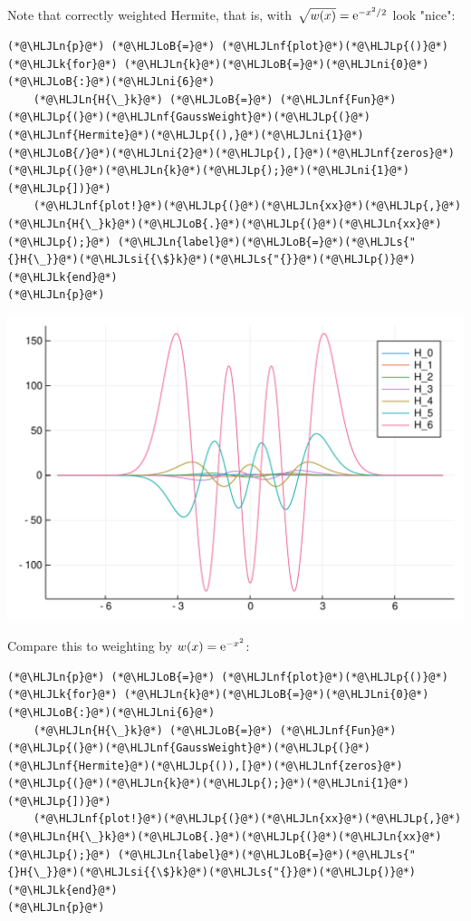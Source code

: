 \documentclass[12pt,a4paper]{article}
\newcommand{\HLJLk}[1]{\textcolor[RGB]{148,91,176}{\textbf{#1}}}
\newcommand{\HLJLn}[1]{#1}
\newcommand{\HLJLnf}[1]{\textcolor[RGB]{66,102,213}{#1}}
\newcommand{\HLJLs}[1]{\textcolor[RGB]{201,61,57}{#1}}
\newcommand{\HLJLsi}[1]{#1}
\newcommand{\HLJLni}[1]{\textcolor[RGB]{59,151,46}{#1}}
\newcommand{\HLJLoB}[1]{\textcolor[RGB]{102,102,102}{\textbf{#1}}}
\newcommand{\HLJLp}[1]{#1}
\def\E{ {\rm e} }
\begin{document}
Note that correctly weighted Hermite, that is, with $\sqrt{w(x)} = \E^{-x^2/2}$ look "nice":


\begin{lstlisting}
(*@\HLJLn{p}@*) (*@\HLJLoB{=}@*) (*@\HLJLnf{plot}@*)(*@\HLJLp{()}@*)
(*@\HLJLk{for}@*) (*@\HLJLn{k}@*)(*@\HLJLoB{=}@*)(*@\HLJLni{0}@*)(*@\HLJLoB{:}@*)(*@\HLJLni{6}@*)
    (*@\HLJLn{H{\_}k}@*) (*@\HLJLoB{=}@*) (*@\HLJLnf{Fun}@*)(*@\HLJLp{(}@*)(*@\HLJLnf{GaussWeight}@*)(*@\HLJLp{(}@*)(*@\HLJLnf{Hermite}@*)(*@\HLJLp{(),}@*)(*@\HLJLni{1}@*)(*@\HLJLoB{/}@*)(*@\HLJLni{2}@*)(*@\HLJLp{),[}@*)(*@\HLJLnf{zeros}@*)(*@\HLJLp{(}@*)(*@\HLJLn{k}@*)(*@\HLJLp{);}@*)(*@\HLJLni{1}@*)(*@\HLJLp{])}@*)
    (*@\HLJLnf{plot!}@*)(*@\HLJLp{(}@*)(*@\HLJLn{xx}@*)(*@\HLJLp{,}@*) (*@\HLJLn{H{\_}k}@*)(*@\HLJLoB{.}@*)(*@\HLJLp{(}@*)(*@\HLJLn{xx}@*)(*@\HLJLp{);}@*) (*@\HLJLn{label}@*)(*@\HLJLoB{=}@*)(*@\HLJLs{"{}H{\_}}@*)(*@\HLJLsi{{\$}k}@*)(*@\HLJLs{"{}}@*)(*@\HLJLp{)}@*)
(*@\HLJLk{end}@*)
(*@\HLJLn{p}@*)
\end{lstlisting}

\includegraphics[width=\linewidth]{figures/Lecture24_5_1.pdf}

Compare this to weighting by $w(x) = \E^{-x^2}$:


\begin{lstlisting}
(*@\HLJLn{p}@*) (*@\HLJLoB{=}@*) (*@\HLJLnf{plot}@*)(*@\HLJLp{()}@*)
(*@\HLJLk{for}@*) (*@\HLJLn{k}@*)(*@\HLJLoB{=}@*)(*@\HLJLni{0}@*)(*@\HLJLoB{:}@*)(*@\HLJLni{6}@*)
    (*@\HLJLn{H{\_}k}@*) (*@\HLJLoB{=}@*) (*@\HLJLnf{Fun}@*)(*@\HLJLp{(}@*)(*@\HLJLnf{GaussWeight}@*)(*@\HLJLp{(}@*)(*@\HLJLnf{Hermite}@*)(*@\HLJLp{()),[}@*)(*@\HLJLnf{zeros}@*)(*@\HLJLp{(}@*)(*@\HLJLn{k}@*)(*@\HLJLp{);}@*)(*@\HLJLni{1}@*)(*@\HLJLp{])}@*)
    (*@\HLJLnf{plot!}@*)(*@\HLJLp{(}@*)(*@\HLJLn{xx}@*)(*@\HLJLp{,}@*) (*@\HLJLn{H{\_}k}@*)(*@\HLJLoB{.}@*)(*@\HLJLp{(}@*)(*@\HLJLn{xx}@*)(*@\HLJLp{);}@*) (*@\HLJLn{label}@*)(*@\HLJLoB{=}@*)(*@\HLJLs{"{}H{\_}}@*)(*@\HLJLsi{{\$}k}@*)(*@\HLJLs{"{}}@*)(*@\HLJLp{)}@*)
(*@\HLJLk{end}@*)
(*@\HLJLn{p}@*)
\end{lstlisting}
\end{document}

